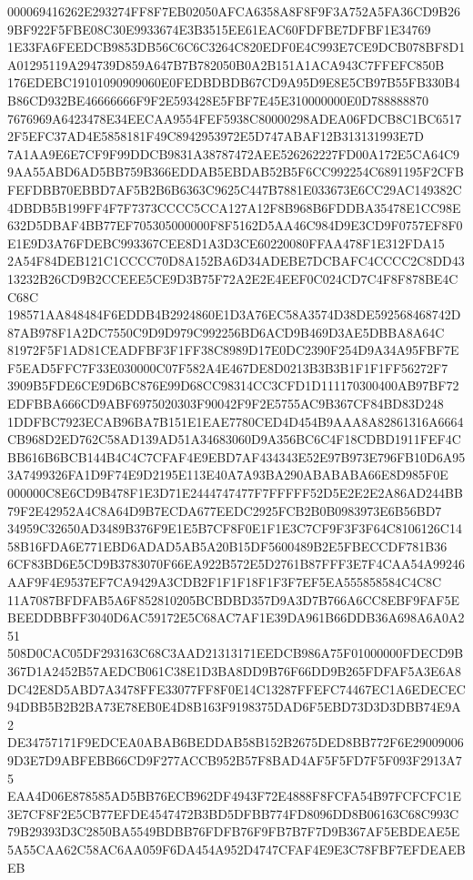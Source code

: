 \documentclass[UTF8,fontset=fandol,zihao=-4,a4paper]{ctexart}
\begin{document}
{{000069416262E293274FF8F7EB02050AFCA6358A8F8F9F3A752A5FA36CD9B269BF922F5FBE08C30E9933674E3B3515EE61EAC60FDFBE7DFBF1E34769
1E33FA6FEEDCB9853DB56C6C6C3264C820EDF0E4C993E7CE9DCB078BF8D1A01295119A294739D859A647B7B782050B0A2B151A1ACA943C7FFEFC850B
176EDEBC19101090909060E0FEDBDBDB67CD9A95D9E8E5CB97B55FB330B4B86CD932BE46666666F9F2E593428E5FBF7E45E310000000E0D788888870
7676969A6423478E34EECAA9554FEF5938C80000298ADEA06FDCB8C1BC65172F5EFC37AD4E5858181F49C8942953972E5D747ABAF12B313131993E7D
7A1AA9E6E7CF9F99DDCB9831A38787472AEE526262227FD00A172E5CA64C99AA55ABD6AD5BB759B366EDDAB5EBDAB52B5F6CC992254C6891195F2CFB
FEFDBB70EBBD7AF5B2B6B6363C9625C447B7881E033673E6CC29AC149382C4DBDB5B199FF4F7F7373CCCC5CCA127A12F8B968B6FDDBA35478E1CC98E
632D5DBAF4BB77EF705305000000F8F5162D5AA46C984D9E3CD9F0757EF8F0E1E9D3A76FDEBC993367CEE8D1A3D3CE60220080FFAA478F1E312FDA15
2A54F84DEB121C1CCCC70D8A152BA6D34ADEBE7DCBAFC4CCCC2C8DD4313232B26CD9B2CCEEE5CE9D3B75F72A2E2E4EEF0C024CD7C4F8F878BE4CC68C
198571AA848484F6EDDB4B2924860E1D3A76EC58A3574D38DE592568468742D87AB978F1A2DC7550C9D9D979C992256BD6ACD9B469D3AE5DBBA8A64C
81972F5F1AD81CEADFBF3F1FF38C8989D17E0DC2390F254D9A34A95FBF7EF5EAD5FFC7F33E030000C07F582A4E467DE8D0213B3B3B1F1F1FF56272F7
3909B5FDE6CE9D6BC876E99D68CC98314CC3CFD1D111170300400AB97BF72EDFBBA666CD9ABF6975020303F90042F9F2E5755AC9B367CF84BD83D248
1DDFBC7923ECAB96BA7B151E1EAE7780CED4D454B9AAA8A82861316A6664CB968D2ED762C58AD139AD51A34683060D9A356BC6C4F18CDBD1911FEF4C
BB616B6BCB144B4C4C7CFAF4E9EBD7AF434343E52E97B973E796FB10D6A953A7499326FA1D9F74E9D2195E113E40A7A93BA290ABABABA66E8D985F0E
000000C8E6CD9B478F1E3D71E2444747477F7FFFFF52D5E2E2E2A86AD244BB79F2E42952A4C8A64D9B7ECDA677EEDC2925FCB2B0B0983973E6B56BD7
34959C32650AD3489B376F9E1E5B7CF8F0E1F1E3C7CF9F3F3F64C8106126C1458B16FDA6E771EBD6ADAD5AB5A20B15DF5600489B2E5FBECCDF781B36
6CF83BD6E5CD9B3783070F66EA922B572E5D2761B87FFF3E7F4CAA54A99246AAF9F4E9537EF7CA9429A3CDB2F1F1F18F1F3F7EF5EA555858584C4C8C
11A7087BFDFAB5A6F852810205BCBDBD357D9A3D7B766A6CC8EBF9FAF5EBEEDDBBFF3040D6AC59172E5C68AC7AF1E39DA961B66DDB36A698A6A0A251
508D0CAC05DF293163C68C3AAD21313171EEDCB986A75F01000000FDECD9B367D1A2452B57AEDCB061C38E1D3BA8DD9B76F66DD9B265FDFAF5A3E6A8
DC42E8D5ABD7A3478FFE33077FF8F0E14C13287FFEFC74467EC1A6EDECEC94DBB5B2B2BA73E78EB0E4D8B163F9198375DAD6F5EBD73D3D3DBB74E9A2
DE34757171F9EDCEA0ABAB6BEDDAB58B152B2675DED8BB772F6E290090069D3E7D9ABFEBB66CD9F277ACCB952B57F8BAD4AF5F5FD7F5F093F2913A75
EAA4D06E878585AD5BB76ECB962DF4943F72E4888F8FCFA54B97FCFCFC1E3E7CF8F2E5CB77EFDE4547472B3BD5DFBB774FD8096DD8B06163C68C993C
79B29393D3C2850BA5549BDBB76FDFB76F9FB7B7F7D9B367AF5EBDEAE5E5A55CAA62C58AC6AA059F6DA454A952D4747CFAF4E9E3C78FBF7EFDEAEBEB
}}
\end{document}
